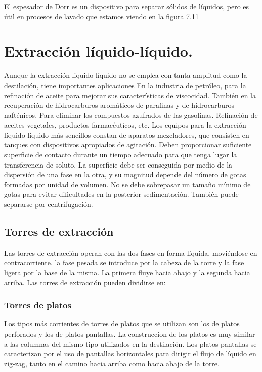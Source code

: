 \documentclass[12pt,openany]{book}
\begin{document}
El espesador de Dorr es un dispositivo para separar sólidos de líquidos, pero es útil en procesos de lavado que estamos viendo
en la figura 7.11

\section {Extracción líquido-líquido.}
Aunque la extracción liquido-líquido no se emplea con tanta amplitud como la destilación, tiene importantes aplicaciones
En la industria de petróleo, para la refinación de aceite para mejorar sus características de viscocidad. También en la recuperación
de hidrocarburos aromáticos de parafinas y de hidrocarburos nafténicos.
Para eliminar los compuestos azufrados de las gasolinas. Refinación de aceites vegetales, productos farmacéuticos, etc.
Los equipos para la extracción líquido-líquido más sencillos constan de aparatos mezcladores, que consisten en tanques con dispositivos
apropiados de agitación. Deben proporcionar suficiente superficie de contacto durante un tiempo adecuado para que tenga lugar la transferencia
de soluto.
La superficie debe ser conseguida por medio de la dispersión de una fase en la otra, y su magnitud depende del número de gotas
formadas por unidad de volumen. No se debe sobrepasar un tamaño mínimo de gotas para evitar dificultades en la posterior sedimentación. También
puede separarse por centrifugación.

\subsection {Torres de extracción}

Las torres de extracción operan con las dos fases en forma líquida, moviéndose en contracorriente. la fase pesada se introduce por la cabeza
de la torre y la fase ligera por la base de la misma. La primera fluye hacia abajo y la segunda hacia arriba. Las torres de extracción pueden 
dividirse en:
\subsubsection{Torres de platos}
Los tipos más corrientes de torres de platos que se utilizan son los de platos perforados y los de platos pantallas. La construccion de los platos 
es muy similar a las columnas del mismo tipo utilizados en la destilación.
Los platos pantallas se caracterizan por el uso de pantallas horizontales para dirigir el flujo de líquido en zig-zag, tanto en el camino hacia arriba 
como hacia abajo de la torre.
\end{document}
